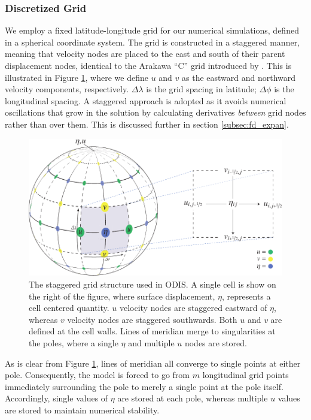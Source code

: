 \subsubsection{Discretized Grid \label{subsec:grid}}

We employ a fixed latitude-longitude grid for our numerical simulations, defined in a spherical coordinate system. The grid is constructed in a staggered manner, meaning that velocity nodes are placed to the east and south of their parent displacement nodes, identical to the Arakawa ``C'' grid introduced by \citet{arakawa1977computational}. This is illustrated in Figure \ref{fig:grid}, where we define $u$ and $v$ as the eastward and northward velocity components, respectively. $\Delta \lambda$ is the grid spacing in latitude; $\Delta \phi$ is the longitudinal spacing. A staggered approach is adopted as it avoids numerical oscillations that grow in the solution by calculating derivatives \textit{between} grid nodes rather than over them. This is discussed further in section \ref{subsec:fd_expan}.

\begin{figure}[t]
\centering
\includegraphics[width=0.8\linewidth]{Figures/GridDiagram}
\caption{The staggered grid structure used in ODIS. A single cell is show on the right of the figure, where surface displacement, $\eta$, represents a cell centered quantity. $u$ velocity nodes are staggered eastward of $\eta$, whereas $v$ velocity nodes are staggered southwards. Both $u$ and $v$ are defined at the cell walls. Lines of meridian merge to singularities at the poles, where a single $\eta$ and multiple $u$ nodes are stored.\label{fig:grid}}
\end{figure}

As is clear from Figure \ref{fig:grid}, lines of meridian all converge to single points at either pole. Consequently, the model is forced to go from $m$ longitudinal grid points immediately surrounding the pole to merely a single point at the pole itself. Accordingly, single values of $\eta$ are stored at each pole, whereas multiple $u$ values are stored to maintain numerical stability. 

